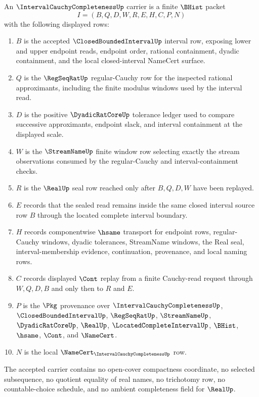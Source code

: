 \begin{definition}
\label{def:interval-cauchy-completeness-carrier}
An $\IntervalCauchyCompletenessUp$ carrier is a finite $\BHist$ packet
$$
I=(B,Q,D,W,R,E,H,C,P,N)
$$
with the following displayed rows:
\begin{enumerate}
\item $B$ is the accepted $\ClosedBoundedIntervalUp$ interval row, exposing lower and upper endpoint reads, endpoint order, rational containment, dyadic containment, and the local closed-interval NameCert surface.
\item $Q$ is the $\RegSeqRatUp$ regular-Cauchy row for the inspected rational approximants, including the finite modulus windows used by the interval read.
\item $D$ is the positive $\DyadicRatCoreUp$ tolerance ledger used to compare successive approximants, endpoint slack, and interval containment at the displayed scale.
\item $W$ is the $\StreamNameUp$ finite window row selecting exactly the stream observations consumed by the regular-Cauchy and interval-containment checks.
\item $R$ is the $\RealUp$ seal row reached only after $B,Q,D,W$ have been replayed.
\item $E$ records that the sealed read remains inside the same closed interval source row $B$ through the located complete interval boundary.
\item $H$ records componentwise $\hsame$ transport for endpoint rows, regular-Cauchy windows, dyadic tolerances, StreamName windows, the Real seal, interval-membership evidence, continuation, provenance, and local naming rows.
\item $C$ records displayed $\Cont$ replay from a finite Cauchy-read request through $W,Q,D,B$ and only then to $R$ and $E$.
\item $P$ is the $\Pkg$ provenance over $\IntervalCauchyCompletenessUp$, $\ClosedBoundedIntervalUp$, $\RegSeqRatUp$, $\StreamNameUp$, $\DyadicRatCoreUp$, $\RealUp$, $\LocatedCompleteIntervalUp$, $\BHist$, $\hsame$, $\Cont$, and $\NameCert$.
\item $N$ is the local $\NameCert_{\IntervalCauchyCompletenessUp}$ row.
\end{enumerate}
The accepted carrier contains no open-cover compactness coordinate, no selected subsequence, no quotient equality of real names, no trichotomy row, no countable-choice schedule, and no ambient completeness field for $\RealUp$.
\end{definition}

